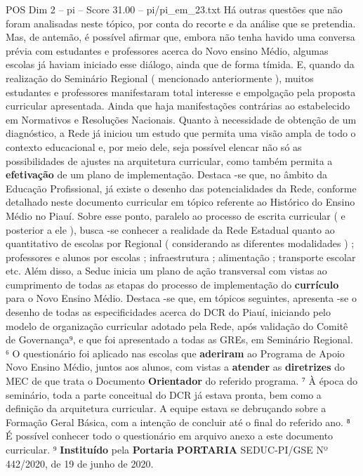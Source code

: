 \begin{textsample}{POS Dim 2 – pi – Score 31.00 – pi/pi\_em\_23.txt}
Há outras questões que não foram analisadas neste tópico, por conta do recorte e da análise que se pretendia.
Mas, de antemão, é possível afirmar que, embora não tenha havido uma conversa prévia com estudantes e professores acerca do Novo ensino Médio, algumas escolas já haviam iniciado esse diálogo, ainda que de forma tímida.
E, quando da realização do Seminário Regional ( mencionado anteriormente ), muitos estudantes e professores manifestaram total interesse e empolgação pela proposta curricular apresentada.
Ainda que haja manifestações contrárias ao estabelecido em Normativos e Resoluções Nacionais.
Quanto à necessidade de obtenção de um diagnóstico, a Rede já iniciou um estudo que permita uma visão ampla de todo o contexto educacional e, por meio dele, seja possível elencar não só as possibilidades de ajustes na arquitetura curricular, como também permita a \textbf{efetivação} de um plano de implementação.
Destaca -se que, no âmbito da Educação Profissional, já existe o desenho das potencialidades da Rede, conforme detalhado neste documento curricular em tópico referente ao Histórico do Ensino Médio no Piauí.
Sobre esse ponto, paralelo ao processo de escrita curricular ( e posterior a ele ), busca -se conhecer a realidade da Rede Estadual quanto ao quantitativo de escolas por Regional ( considerando as diferentes modalidades ) ; professores e alunos por escolas ; infraestrutura ; alimentação ; transporte escolar etc.
Além disso, a Seduc inicia um plano de ação transversal com vistas ao cumprimento de todas as etapas do processo de implementação do \textbf{currículo} para o Novo Ensino Médio.
Destaca -se que, em tópicos seguintes, apresenta -se o desenho de todas as especificidades acerca do DCR do Piauí, iniciando pelo modelo de organização curricular adotado pela Rede, após validação do Comitê de Governança⁹, e que foi apresentado a todas as GREs, em Seminário Regional. ⁶ O questionário foi aplicado nas escolas que \textbf{aderiram} ao Programa de Apoio Novo Ensino Médio, juntos aos alunos, com vistas a \textbf{atender} as \textbf{diretrizes} do MEC de que trata o Documento \textbf{Orientador} do referido programa. ⁷ À época do seminário, toda a parte conceitual do DCR já estava pronta, bem como a definição da arquitetura curricular.
A equipe estava se debruçando sobre a Formação Geral Básica, com a intenção de concluir até o final do referido ano. ⁸ É possível conhecer todo o questionário em arquivo anexo a este documento curricular. ⁹ \textbf{Instituído} pela \textbf{Portaria} \textbf{PORTARIA} SEDUC-PI/GSE Nº 442/2020, de 19 de junho de 2020.

\end{textsample}
